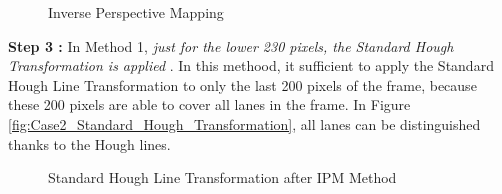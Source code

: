  
\begin{figure}[H]
  \centering
  \hfill
  \caption{Inverse Perspective Mapping}
\end{figure} 


\textbf{Step 3 : }In Method 1, \emph{\color{green}just for the lower 230 pixels, the Standard Hough Transformation is applied} . In this methood, it sufficient to apply the Standard Hough Line Transformation to only the last 200 pixels of the frame, because these 200 pixels are able to cover all lanes in the frame. In Figure \ref{fig:Case2_Standard_Hough_Transformation}, all lanes can be distinguished thanks to the Hough lines. 


\begin{figure}[H]
  \centering
  \caption{Standard Hough Line Transformation after IPM Method}
\end{figure} 



